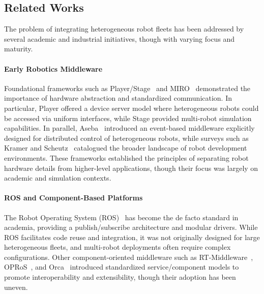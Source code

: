 \documentclass[conference]{IEEEtran}
\begin{document}
\subsection{Related Works}
The problem of integrating heterogeneous robot fleets has been addressed 
 by several academic and industrial initiatives, though with varying focus and maturity.

\paragraph{Early Robotics Middleware} 
Foundational frameworks such as Player/Stage~\cite{vaughan2003player} 
 and MIRO~\cite{DBLP:journals/trob/UtzSEK02} demonstrated the importance 
 of hardware abstraction and standardized communication. 
%
In particular, 
 Player offered a device server model where heterogeneous robots could be accessed via uniform interfaces, 
 while Stage provided multi-robot simulation capabilities. 
%
In parallel, Aseba~\cite{magnenat2007aseba} introduced an event-based middleware 
 explicitly designed for distributed control of heterogeneous robots, 
 while surveys such as Kramer and Scheutz~\cite{DBLP:journals/arobots/KramerS07} 
 catalogued the broader landscape of robot development environments.
%
These frameworks established the principles of separating robot hardware details from higher-level applications, 
 though their focus was largely on academic and simulation contexts.

\paragraph{ROS and Component-Based Platforms} 
The Robot Operating System (ROS)~\cite{quigley2009ros} has become the de facto standard in academia, 
 providing a publish/subscribe architecture and modular drivers. 
%
While ROS facilitates code reuse and integration, it was not originally designed for large heterogeneous fleets, 
 and multi-robot deployments often require complex configurations. 
%
Other component-oriented middleware such as RT-Middleware~\cite{DBLP:conf/iros/AndoSKKY05}, 
 OPRoS~\cite{jang2010opros}, and Orca~\cite{makarenko2006orca} introduced standardized service/component models 
 to promote interoperability and extensibility, 
 though their adoption has been uneven.
\end{document}
